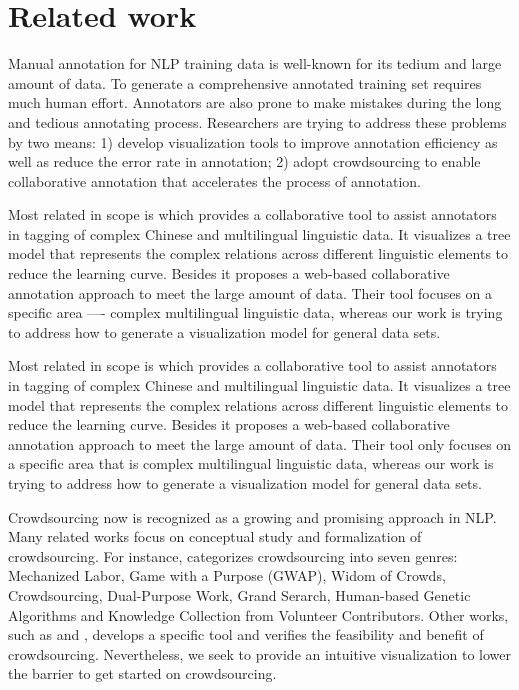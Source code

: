 \section{Related work}

Manual annotation for NLP training data is well-known for its tedium
and large amount of data. To generate a comprehensive annotated
training set requires much human effort. Annotators are also prone to
make mistakes during the long and tedious annotating process.
Researchers are trying to address these problems by two means: 1)
develop visualization tools to improve annotation efficiency as well
as reduce the error rate in annotation; 2) adopt crowdsourcing to
enable collaborative annotation that accelerates the process of
annotation.

Most related in scope is \cite{yan2012collaborative} which provides a
collaborative tool to assist annotators in tagging of complex Chinese
and multilingual linguistic data. It visualizes a tree model that
represents the complex relations across different linguistic elements
to reduce the learning curve. Besides it proposes a web-based
collaborative annotation approach to meet the large amount of data.
Their tool focuses on a specific area ---- complex multilingual
linguistic data, whereas our work is trying to address how to generate
a visualization model for general data sets.

Most related in scope is \cite{yan2012collaborative} which provides a
collaborative tool to assist annotators in tagging of complex Chinese
and multilingual linguistic data. It visualizes a tree model that
represents the complex relations across different linguistic elements
to reduce the learning curve. Besides it proposes a web-based
collaborative annotation approach to meet the large amount of data.
Their tool only focuses on a specific area that is complex
multilingual linguistic data, whereas our work is trying to address
how to generate a visualization model for general data sets.

Crowdsourcing now is recognized as a growing and promising approach in
NLP. Many related works focus on conceptual study and formalization of
crowdsourcing. For instance, \cite{quinn2009taxonomy} categorizes
crowdsourcing into seven genres: Mechanized Labor, Game with a Purpose
(GWAP), Widom of Crowds, Crowdsourcing, Dual-Purpose Work, Grand
Serarch, Human-based Genetic Algorithms and Knowledge Collection from
Volunteer Contributors. Other works, such as
\cite{abekawa2010community} and \cite{irvine2010using}, develops a
specific tool and verifies the feasibility and benefit of
crowdsourcing. Nevertheless, we seek to provide an intuitive
visualization to lower the barrier to get started on crowdsourcing. 

